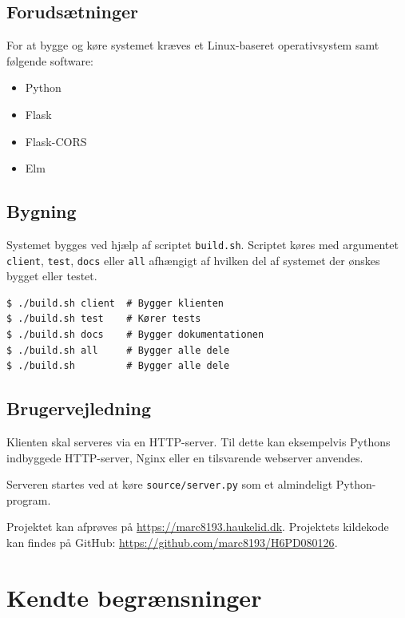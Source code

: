 \documentclass[a4paper, 11pt]{article}
\begin{document}
\subsection{Forudsætninger}

For at bygge og køre systemet kræves et Linux-baseret operativsystem samt følgende software:

\begin{itemize}
  \item Python~\cite{python}
  \item Flask~\cite{flask}
  \item Flask-CORS~\cite{flask_cors}
  \item Elm~\cite{elm}
\end{itemize}

\subsection{Bygning}

Systemet bygges ved hjælp af scriptet \texttt{build.sh}. Scriptet køres med argumentet
\texttt{client}, \texttt{test}, \texttt{docs} eller \texttt{all} afhængigt af hvilken del
af systemet der ønskes bygget eller testet.

\begin{verbatim}
$ ./build.sh client  # Bygger klienten
$ ./build.sh test    # Kører tests
$ ./build.sh docs    # Bygger dokumentationen
$ ./build.sh all     # Bygger alle dele
$ ./build.sh         # Bygger alle dele
\end{verbatim}

\subsection{Brugervejledning}

Klienten skal serveres via en HTTP-server. Til dette kan eksempelvis Pythons indbyggede
HTTP-server, Nginx eller en tilsvarende webserver anvendes.

Serveren startes ved at køre \texttt{source/server.py} som et almindeligt Python-program.

Projektet kan afprøves på \url{https://marc8193.haukelid.dk}.
Projektets kildekode kan findes på GitHub: \url{https://github.com/marc8193/H6PD080126}.

\section{Kendte begrænsninger}
\end{document}
